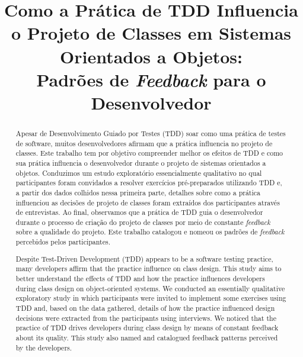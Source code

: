 \documentclass[conference]{IEEEtran}
\begin{document}
	
\title{Como a Prática de TDD Influencia o Projeto de Classes em Sistemas Orientados a Objetos: \\Padrões de \textit{Feedback} para o Desenvolvedor}

\author{
}

\maketitle


\begin{abstract} 
	Apesar de Desenvolvimento Guiado por Testes (TDD) soar como uma prática de testes de software, 
	muitos desenvolvedores afirmam que a prática influencia no projeto de classes.
	Este trabalho tem por objetivo compreender melhor os efeitos de TDD e como sua prática 
	influencia o desenvolvedor durante o projeto de sistemas orientados a objetos.
	Conduzimos um estudo exploratório essencialmente qualitativo 
	no qual participantes foram convidados a resolver exercícios 
	pré-preparados utilizando TDD e, a partir 
	dos dados colhidos nessa primeira parte, detalhes sobre como a prática influenciou as 
	decisões de projeto de classes foram extraídos dos participantes através de 
	entrevistas. Ao final, observamos que a prática de TDD guia o desenvolvedor durante o processo
	de criação do projeto de classes por meio de constante \textit{feedback} sobre a qualidade
	do projeto. Este trabalho catalogou e nomeou os padrões de
	\textit{feedback} percebidos pelos participantes.
\end{abstract}

\vspace{0.2cm}

\begin{abstract} 
	Despite Test-Driven Development (TDD) appears to be a software testing practice, 
	many developers affirm that the practice influence on class design. This study aims
	to better understand the effects of TDD and how the practice influences developers
	during class design on object-oriented systems. 
	We conducted an essentially qualitative exploratory study in which participants
	were invited to implement some exercises using TDD and, based on the data gathered,
	details of how the practice influenced design decisions were extracted from the
	participants using interviews.
	We noticed that the practice of TDD drives
	developers during class design by means of constant feedback about its quality. This study
	also named and catalogued feedback patterns perceived by the developers.
\end{abstract}
\end{document}
